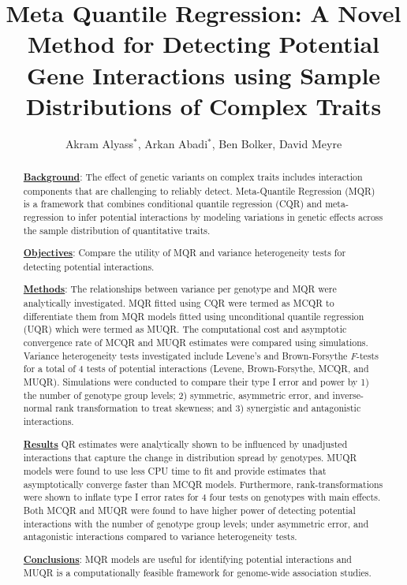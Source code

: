 \documentclass[12pt]{article}
\title{Meta Quantile Regression: A Novel Method for Detecting Potential Gene Interactions using Sample Distributions of Complex Traits}
\author{Akram Alyass$^*$, Arkan Abadi$^*$, Ben Bolker, David Meyre}
\begin{document}
\setcounter{secnumdepth}{0} %

\begin{titlingpage}
    \maketitle
    \begin{abstract}
\underline{\textbf{Background}}: The effect of genetic variants on complex traits includes interaction components that are challenging to reliably detect. Meta-Quantile Regression (MQR) is a framework that combines conditional quantile regression (CQR) and meta-regression to infer potential interactions by modeling variations in genetic effects across the sample distribution of quantitative traits. 

\underline{\textbf{Objectives}}: Compare the utility of MQR and variance heterogeneity tests for detecting potential interactions. 

\underline{\textbf{Methods}}: The relationships between variance per genotype and MQR were analytically investigated. MQR fitted using CQR were termed as MCQR to differentiate them from MQR models fitted using unconditional quantile regression (UQR) which were termed as MUQR. The computational cost and asymptotic convergence rate of MCQR and MUQR estimates were compared using simulations.  Variance heterogeneity tests investigated include Levene's and Brown-Forsythe \textit{F}-tests for a total of 4 tests of potential interactions (Levene, Brown-Forsythe, MCQR, and MUQR). Simulations were conducted to compare their type I error and power by 1) the number of genotype group levels; 2) symmetric, asymmetric error, and inverse-normal rank transformation to treat skewness; and 3) synergistic and antagonistic interactions. 

\underline{\textbf{Results}} QR estimates were analytically shown to be influenced by unadjusted interactions that capture the change in distribution spread by genotypes. MUQR models were found to use less CPU time to fit and provide estimates that asymptotically converge faster than MCQR models. Furthermore, rank-transformations were shown to inflate type I error rates for 4 four tests on genotypes with main effects. Both MCQR and MUQR were found to have higher power of detecting potential interactions with the number of genotype group levels; under asymmetric error, and antagonistic interactions compared to variance heterogeneity tests. 

\underline{\textbf{Conclusions}}: MQR models are useful for identifying potential interactions and MUQR is a computationally feasible framework for genome-wide association studies.

    \end{abstract}
\end{titlingpage}
 
\end{document}
